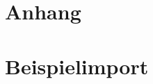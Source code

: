 \documentclass[12pt,a4paper, listof=entryprefix, bibliography=totocnumbered,toc=listofnumbered,lof=listofnumbered]{scrartcl}
\begin{document}
\setcounter{page}{1}  %
\begin{appendix}
	 \label{Anhang}
	\section*{Anhang} %
	\renewcommand{\thesection}{\Roman{section}}
	
	\setcounter{section}{0} %
	\section{Beispielimport}
	\label{app:beispielimport}
	
	
\end{appendix}
\end{document}
